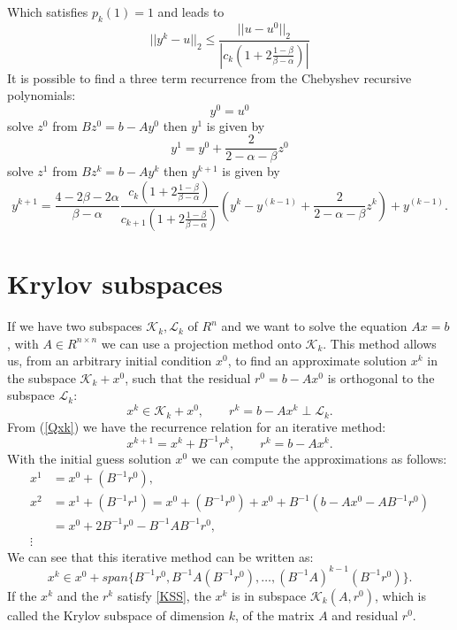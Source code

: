 \documentclass[a4paper,10pt]{report}
\begin{document}
Which satisfies $p_k(1)=1$ and leads to
\begin{equation*}
||y^k-u||_2\leq \frac{||u-u^0||_2}{|c_k(1+2\frac{1-\beta}{\beta-\alpha})|}
\end{equation*}
It is possible to find a three term recurrence from the Chebyshev recursive polynomials:
\begin{equation*}
 y^0=u^0
\end{equation*}
solve $z^0$ from $Bz^0=b-Ay^0$ then $y^1$ is given by
\begin{equation*}
y^1=y^0+\frac{2}{2-\alpha-\beta}z^0
\end{equation*}
solve $z^1$ from $Bz^k=b-Ay^k$ then $y^{k+1}$ is given by
\begin{equation*}
y^{k+1}=\frac{4-2\beta-2\alpha}{\beta-\alpha}\frac{c_k(1+2\frac{1-\beta}{\beta-\alpha})}{c_{k+1}(1+2\frac{1-\beta}{\beta-\alpha})}(y^k-y^{(k-1)}+\frac{2}{2-\alpha-\beta}z^k)+y^{(k-1)}.
\end{equation*}


\section{Krylov subspaces}
If we have two subspaces $\mathcal{K}_k, \mathcal{L}_k$ of $R^n$ and we want to solve the equation $Ax=b$, with $A \in R^{n\times n}$ we can use a projection method onto $\mathcal{K}_k$.
This method allows us, from an arbitrary initial condition $x^0$, to find an approximate solution $x^k$ in the subspace $\mathcal{K}_k+x^0$,
such that the residual $r^0=b-Ax^0$ is orthogonal to the subspace $\mathcal{L}_k$:
\begin{equation}
 x^k \in \mathcal{K}_k+x^0, \qquad r^k=b-Ax^k \perp \mathcal{L}_k. \label{KSS}
\end{equation}
From (\ref{Qxk}) we have the recurrence relation for an iterative method:
\begin{equation*}
 x^{k+1}=x^k+B^{-1}r^k, \qquad r^k=b-Ax^k.
\end{equation*}
With the initial guess solution $x^0$ we can compute the approximations as follows:
\begin{align*}
x^1&=x^0+(B^{-1}r^0),\\
x^2&=x^1+(B^{-1}r^1)=x^0+(B^{-1}r^0)+x^0+B^{-1}(b-Ax^0-AB^{-1}r^0)\\
&=x^0+2B^{-1}r^0-B^{-1}AB^{-1}r^0,\\
\vdots
\end{align*}
We can see that this iterative method can be written as:
\begin{equation*}
x^k \in x^0+span\{B^{-1}r^0,B^{-1}A(B^{-1}r^0),\dots,(B^{-1}A)^{k-1}(B^{-1}r^0)\}.
\end{equation*}
If the $x^k$ and the $r^k$ satisfy \eqref{KSS}, the $x^k$ is in subspace $\mathcal{K}_k(A,r^0)$, which is called the Krylov subspace of dimension $k$, of the matrix $A$ and residual $r^0$.\\
\end{document}
